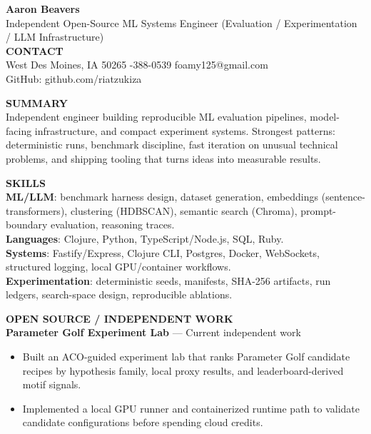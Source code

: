 \documentclass[10pt]{article}
\begin{document}
{\LARGE \textbf{Aaron Beavers}}\\
Independent Open-Source ML Systems Engineer (Evaluation / Experimentation / LLM Infrastructure)\\

\vspace{2pt}
\textbf{CONTACT}\\
West Des Moines, IA 50265 \;\;\textbar\;-388-0539 \;\;\textbar\;\; foamy125@gmail.com\\
GitHub: github.com/riatzukiza

\vspace{4pt}
\textbf{SUMMARY}\\
Independent engineer building reproducible ML evaluation pipelines, model-facing infrastructure, and compact experiment systems. Strongest patterns: deterministic runs, benchmark discipline, fast iteration on unusual technical problems, and shipping tooling that turns ideas into measurable results.

\vspace{2pt}
\textbf{SKILLS}\\
\textbf{ML/LLM}: benchmark harness design, dataset generation, embeddings (sentence-transformers), clustering (HDBSCAN), semantic search (Chroma), prompt-boundary evaluation, reasoning traces.\\
\textbf{Languages}: Clojure, Python, TypeScript/Node.js, SQL, Ruby.\\
\textbf{Systems}: Fastify/Express, Clojure CLI, Postgres, Docker, WebSockets, structured logging, local GPU/container workflows.\\
\textbf{Experimentation}: deterministic seeds, manifests, SHA-256 artifacts, run ledgers, search-space design, reproducible ablations.

\vspace{4pt}
\textbf{OPEN SOURCE / INDEPENDENT WORK}\\

\textbf{Parameter Golf Experiment Lab} --- Current independent work\\
\vspace{-6pt}
\begin{itemize}
  \setlength\itemsep{-2pt}
  \setlength\parskip{0pt}
  \setlength\parsep{0pt}
  \item Built an ACO-guided experiment lab that ranks Parameter Golf candidate recipes by hypothesis family, local proxy results, and leaderboard-derived motif signals.
  \item Implemented a local GPU runner and containerized runtime path to validate candidate configurations before spending cloud credits.
\end{itemize}
\end{document}
